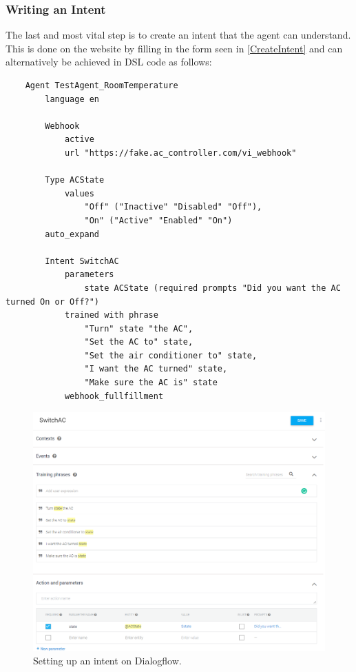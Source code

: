 \subsubsection{Writing an Intent}
The last and most vital step is to create an intent that the agent can understand. This is done on the website by filling in the form seen in \autoref{CreateIntent} and can alternatively be achieved in DSL code as follows:
\begin{verbatim}
    Agent TestAgent_RoomTemperature
        language en 
            
        Webhook 
            active 
            url "https://fake.ac_controller.com/vi_webhook"

        Type ACState
            values 
                "Off" ("Inactive" "Disabled" "Off"),
                "On" ("Active" "Enabled" "On")
        auto_expand

        Intent SwitchAC
            parameters
                state ACState (required prompts "Did you want the AC turned On or Off?")
            trained with phrase
                "Turn" state "the AC",
                "Set the AC to" state,
                "Set the air conditioner to" state,
                "I want the AC turned" state,
                "Make sure the AC is" state
            webhook_fullfillment
\end{verbatim}

\begin{figure}[ht]
    \centering
    \includegraphics[width=1\textwidth]{Thesis Images/CreateIntent.PNG}
    \caption{Setting up an intent on Dialogflow.}
        \label{CreateIntent}
\end{figure}

